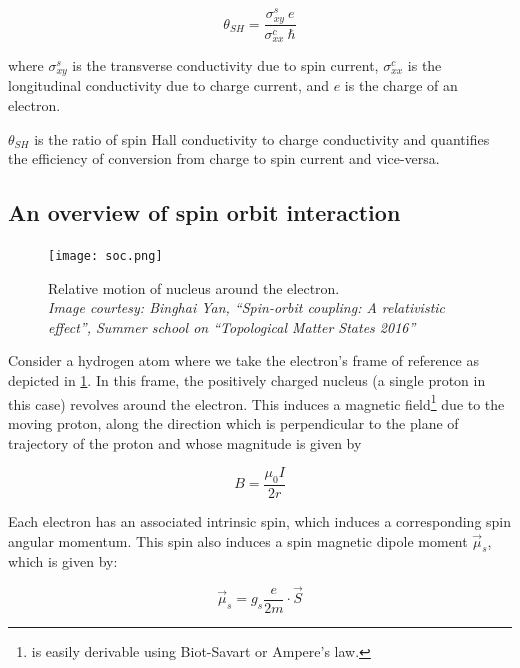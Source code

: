 \begin{equation} \label{eq:sha}
    \theta_{SH} = \frac{\sigma^s_{xy} \: e}{\sigma^c_{xx} \: \hbar}
\end{equation}

where \( \sigma^s_{xy} \) is the transverse conductivity due to spin current, \( \sigma^c_{xx} \) is the longitudinal conductivity due to charge current, and \( e \) is the charge of an electron.

\( \theta_{SH} \) is the ratio of spin Hall conductivity to charge conductivity and quantifies the efficiency of conversion from charge to spin current and vice-versa.

\subsection{An overview of spin orbit interaction}

\begin{figure}[h!]
    \centering
    \texttt{[image: soc.png]}
    \caption{Relative motion of nucleus around the electron.\\ \vspace{0.2cm} \textit{Image courtesy: Binghai Yan, ``Spin-orbit coupling: A relativistic effect'', Summer school on ``Topological Matter States 2016''}}
    \label{fig:soc-atom}
\end{figure}

Consider a hydrogen atom where we take the electron's frame of reference as depicted in \cref{fig:soc-atom}.
In this frame, the positively charged nucleus (a single proton in this case) revolves around the electron.
This induces a magnetic field\footnote{ is easily derivable using Biot-Savart or Ampere's law.} due to the moving proton, along the direction which is perpendicular to the plane of trajectory of the proton and whose magnitude is given by

\begin{equation} \label{eq:B-field-ring}
    B = \frac{\mu_0 I}{2r}
\end{equation}

Each electron has an associated intrinsic spin, which induces a corresponding spin angular momentum.
This spin also induces a spin magnetic dipole moment \( \vec{\mu}_s \), which is given by:

\begin{equation} \label{eq:mu_sS}
    \vec{\mu}_s = g_s \frac{e}{2m} \cdot \vec{S}
\end{equation}

